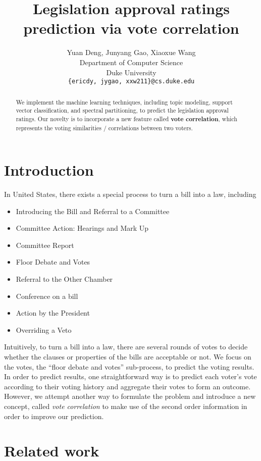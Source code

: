 \documentclass{article} %
\title{Legislation approval ratings prediction via vote correlation}
\author{
Yuan Deng, Junyang Gao, Xiaoxue Wang \\
Department of Computer Science\\
Duke University\\
\texttt{\{ericdy, jygao, xxw211\}@cs.duke.edu} \\
}
\begin{document}
\maketitle

\begin{abstract}
We implement the machine learning techniques, including topic modeling, support vector classification, and spectral partitioning, to predict the legislation approval ratings. Our novelty is to incorporate a new feature called \textbf{vote correlation}, which represents the voting similarities / correlations between two voters. 
\end{abstract}

\section{Introduction}
    In United States, there exists a special process to turn a bill into a law, including\cite{billToLaw}
    \begin{itemize}
        \item Introducing the Bill and Referral to a Committee
        \item Committee Action: Hearings and Mark Up
        \item Committee Report
        \item Floor Debate and Votes
        \item Referral to the Other Chamber
        \item Conference on a bill
        \item Action by the President
        \item Overriding a Veto
    \end{itemize}
    Intuitively, to turn a bill into a law, there are several rounds of votes to decide whether the clauses or properties of the bills are acceptable or not. We focus on the votes, the ``floor debate and votes'' sub-process, to predict the voting  results. In order to predict results, one straightforward way is to predict each voter's vote according to their voting history and aggregate their votes to form an outcome. However, we attempt another way to formulate the problem and introduce a new concept, called {\em vote correlation} to make use of the second order information in order to improve our prediction.

\section{Related work}
\end{document}

